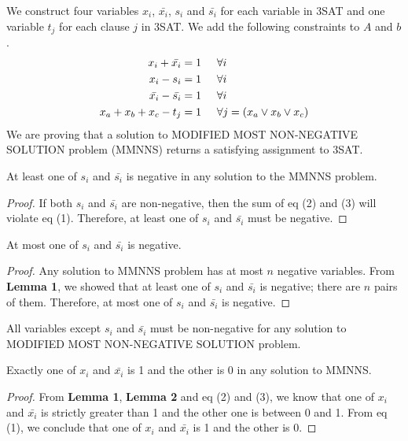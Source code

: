 We construct four variables $x_i$, $\bar{x_i}$, $s_i$ and $\bar{s_i}$ for each variable in 3SAT and one variable $t_j$ for each clause $j$ in 3SAT. We add the following constraints to $A$ and $b$. 
\begin{align}
x_i + \bar{x_i} &= 1 \hspace{5mm} \forall i\\
x_i - s_i &= 1 \hspace{5mm} \forall i\\
\bar{x_i} - \bar{s_i} &= 1\hspace{5mm} \forall i\\
x_a + x_b + x_c - t_j &= 1 \hspace{5mm} \forall j = (x_a\lor x_b \lor x_c)
\end{align}
We are proving that a solution to MODIFIED MOST NON-NEGATIVE SOLUTION problem (MMNNS) returns a satisfying assignment to 3SAT.
\begin{lemma} At least one of $s_i$ and $\bar{s_i}$ is negative in any solution to the MMNNS problem. \end{lemma}
\begin{proof} If both $s_i$ and $\bar{s_i}$ are non-negative, then the sum of eq (2) and (3) will violate eq (1). Therefore, at least one of $s_i$ and $\bar{s_i}$ must be negative.\end{proof}
\begin{lemma} At most one of $s_i$ and $\bar{s_i}$ is negative.\end{lemma}
\begin{proof} Any solution to MMNNS problem has at most $n$ negative variables. From \textbf{Lemma 1}, we showed that at least one of $s_i$ and $\bar{s_i}$ is negative; there are $n$ pairs of them. Therefore, at most one of $s_i$ and $\bar{s_i}$ is negative. \end{proof}
\begin{corollary} All variables except $s_i$ and $\bar{s_i}$ must be non-negative for any solution to MODIFIED MOST NON-NEGATIVE SOLUTION problem.
\end{corollary}
\begin{lemma}Exactly one of $x_i$ and $\bar{x_i}$ is 1 and the other is 0 in any solution to MMNNS.\end{lemma}
\begin{proof} From \textbf{Lemma 1},  \textbf{Lemma 2} and eq (2) and (3), we know that one of $x_i$ and $\bar{x_i}$ is strictly greater than 1 and the other one is between 0 and 1. From eq (1), we conclude that one of $x_i$ and $\bar{x_i}$ is 1 and the other is 0.\end{proof}
